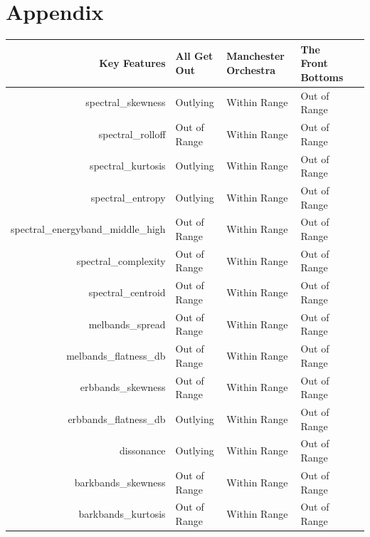 \documentclass{article}\usepackage[]{graphicx}\usepackage[]{xcolor}
\begin{document}
\begin{multicols}{2}
\vspace{2em}

\begin{tiny}

\end{tiny}
\end{multicols}

\newpage
\onecolumn
\section{Appendix}
\begin{table}[ht]
\centering
\begin{tabular}{rllll}
  \hline
  Key Features & All Get Out & Manchester Orchestra & The Front Bottoms \\ 
  \hline
  spectral\_skewness & Outlying & Within Range & Out of Range \\ 
  spectral\_rolloff & Out of Range & Within Range & Out of Range \\ 
  spectral\_kurtosis & Outlying & Within Range & Out of Range \\ 
  spectral\_entropy & Outlying & Within Range & Out of Range \\ 
  spectral\_energyband\_middle\_high & Out of Range & Within Range & Out of Range \\ 
  spectral\_complexity & Out of Range & Within Range & Out of Range \\ 
  spectral\_centroid & Out of Range & Within Range & Out of Range \\ 
  melbands\_spread & Out of Range & Within Range & Out of Range \\ 
  melbands\_flatness\_db & Out of Range & Within Range & Out of Range \\ 
  erbbands\_skewness & Out of Range & Within Range & Out of Range \\ 
  erbbands\_flatness\_db & Outlying & Within Range & Out of Range \\ 
  dissonance & Outlying & Within Range & Out of Range \\ 
  barkbands\_skewness & Out of Range & Within Range & Out of Range \\ 
  barkbands\_kurtosis & Out of Range & Within Range & Out of Range \\ 

\end{tabular}
\end{table}
\end{document}
